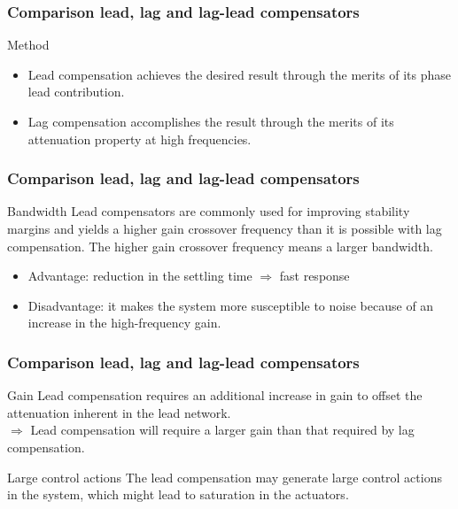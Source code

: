 \begin{frame}
\frametitle{Comparison lead, lag and lag-lead compensators}
\begin{block}{Method}
\begin{itemize}
\item Lead compensation achieves the desired result through the merits of its phase lead
contribution.
\item Lag compensation accomplishes the result through the merits of its attenuation property at high frequencies.
\end{itemize}
\end{block}
\end{frame}

\begin{frame}
\frametitle{Comparison lead, lag and lag-lead compensators}
\begin{block}{Bandwidth}
Lead compensators are commonly used for improving stability margins and yields a higher gain crossover frequency than it is possible with lag compensation. The higher gain crossover frequency means a larger bandwidth.
\begin{itemize}
\item Advantage: reduction in the settling time $\Rightarrow$ fast response
\item Disadvantage: it makes the system more susceptible to noise because of
an increase in the high-frequency gain. 
\end{itemize}
\end{block}
\end{frame}

\begin{frame}
\frametitle{Comparison lead, lag and lag-lead compensators}
\begin{block}{Gain}
Lead compensation requires an additional increase in gain to offset the attenuation
inherent in the lead network. \\
$\Rightarrow$ Lead compensation will require
a larger gain than that required by lag compensation.
\end{block}
\begin{block}{Large control actions}
The lead compensation may generate large control actions in the system, which might lead to saturation in the actuators.
\end{block}
\end{frame}

